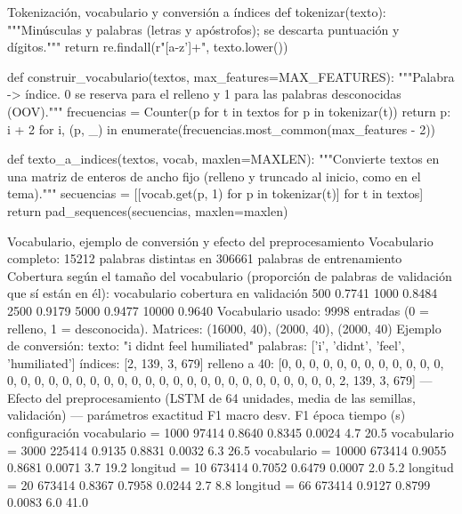 \documentclass[11pt,letterpaper]{article}
\begin{document}
\begin{codigo}[label=cod:prep]{Tokenización, vocabulario y conversión a índices}
def tokenizar(texto):
    """Minúsculas y palabras (letras y apóstrofos); se descarta puntuación y dígitos."""
    return re.findall(r"[a-z']+", texto.lower())


def construir_vocabulario(textos, max_features=MAX_FEATURES):
    """Palabra -> índice. 0 se reserva para el relleno y 1 para las palabras desconocidas (OOV)."""
    frecuencias = Counter(p for t in textos for p in tokenizar(t))
    return {p: i + 2 for i, (p, _) in enumerate(frecuencias.most_common(max_features - 2))}


def texto_a_indices(textos, vocab, maxlen=MAXLEN):
    """Convierte textos en una matriz de enteros de ancho fijo (relleno y truncado al inicio, como en el tema)."""
    secuencias = [[vocab.get(p, 1) for p in tokenizar(t)] for t in textos]
    return pad_sequences(secuencias, maxlen=maxlen)
\end{codigo}

\begin{consola}[label=out:prep]{Vocabulario, ejemplo de conversión y efecto del preprocesamiento}
Vocabulario completo: 15212 palabras distintas en 306661 palabras de entrenamiento
Cobertura según el tamaño del vocabulario (proporción de palabras de validación que sí están en él):
 vocabulario  cobertura en validación
         500                   0.7741
        1000                   0.8484
        2500                   0.9179
        5000                   0.9477
       10000                   0.9640
Vocabulario usado: 9998 entradas (0 = relleno, 1 = desconocida). Matrices: (16000, 40), (2000, 40), (2000, 40)
Ejemplo de conversión:
  texto:    "i didnt feel humiliated"
  palabras: ['i', 'didnt', 'feel', 'humiliated']
  índices:  [2, 139, 3, 679]
  relleno a 40: [0, 0, 0, 0, 0, 0, 0, 0, 0, 0, 0, 0, 0, 0, 0, 0, 0, 0, 0, 0, 0, 0, 0, 0, 0, 0, 0, 0, 0, 0, 0, 0, 0, 0, 0, 0, 2, 139, 3, 679]
--- Efecto del preprocesamiento (LSTM de 64 unidades, media de las semillas, validación) ---
                     parámetros  exactitud  F1 macro  desv. F1  época  tiempo (s)
configuración
vocabulario = 1000        97414     0.8640    0.8345    0.0024    4.7        20.5
vocabulario = 3000       225414     0.9135    0.8831    0.0032    6.3        26.5
vocabulario = 10000      673414     0.9055    0.8681    0.0071    3.7        19.2
longitud = 10            673414     0.7052    0.6479    0.0007    2.0         5.2
longitud = 20            673414     0.8367    0.7958    0.0244    2.7         8.8
longitud = 66            673414     0.9127    0.8799    0.0083    6.0        41.0
\end{consola}
\end{document}
